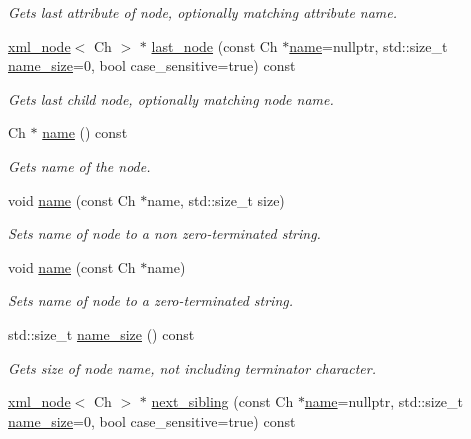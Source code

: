 \begin{DoxyCompactItemize}
\begin{DoxyCompactList}\small\item\em Gets last attribute of node, optionally matching attribute name. \end{DoxyCompactList}\item 
\mbox{\hyperlink{classrapidxml_1_1xml__node}{xml\+\_\+node}}$<$ Ch $>$ $\ast$ \mbox{\hyperlink{classrapidxml_1_1xml__node_a139688bfa43885a5a87b018adaa66618}{last\+\_\+node}} (const Ch $\ast$\mbox{\hyperlink{classrapidxml_1_1xml__base_af8436e9ee14c127220113eaa956eafee}{name}}=nullptr, std\+::size\+\_\+t \mbox{\hyperlink{classrapidxml_1_1xml__base_ad01e2eff02202b130baad012d1ed7328}{name\+\_\+size}}=0, bool case\+\_\+sensitive=true) const
\begin{DoxyCompactList}\small\item\em Gets last child node, optionally matching node name. \end{DoxyCompactList}\item 
Ch $\ast$ \mbox{\hyperlink{classrapidxml_1_1xml__base_af8436e9ee14c127220113eaa956eafee}{name}} () const
\begin{DoxyCompactList}\small\item\em Gets name of the node. \end{DoxyCompactList}\item 
void \mbox{\hyperlink{classrapidxml_1_1xml__base_a4e7e23d06d48126c65b1f6266acfba5c}{name}} (const Ch $\ast$name, std\+::size\+\_\+t size)
\begin{DoxyCompactList}\small\item\em Sets name of node to a non zero-\/terminated string. \end{DoxyCompactList}\item 
void \mbox{\hyperlink{classrapidxml_1_1xml__base_ae099c291e104a0d277307fe71f5e0f9e}{name}} (const Ch $\ast$name)
\begin{DoxyCompactList}\small\item\em Sets name of node to a zero-\/terminated string. \end{DoxyCompactList}\item 
std\+::size\+\_\+t \mbox{\hyperlink{classrapidxml_1_1xml__base_ad01e2eff02202b130baad012d1ed7328}{name\+\_\+size}} () const
\begin{DoxyCompactList}\small\item\em Gets size of node name, not including terminator character. \end{DoxyCompactList}\item 
\mbox{\hyperlink{classrapidxml_1_1xml__node}{xml\+\_\+node}}$<$ Ch $>$ $\ast$ \mbox{\hyperlink{classrapidxml_1_1xml__node_a365211719a7337837a502699275c5db6}{next\+\_\+sibling}} (const Ch $\ast$\mbox{\hyperlink{classrapidxml_1_1xml__base_af8436e9ee14c127220113eaa956eafee}{name}}=nullptr, std\+::size\+\_\+t \mbox{\hyperlink{classrapidxml_1_1xml__base_ad01e2eff02202b130baad012d1ed7328}{name\+\_\+size}}=0, bool case\+\_\+sensitive=true) const

\end{DoxyCompactItemize}
